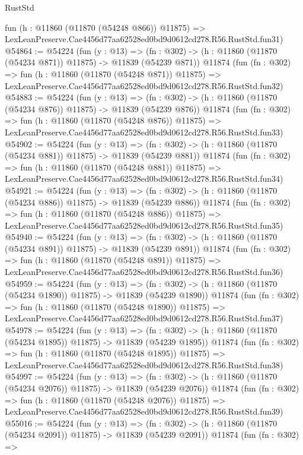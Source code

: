 \begin{lexlean}{RustStd}
\begin{coremodule}
    fun (h : @11860 (@11870 (@54248 @866)) @11875) =>
    LexLeanPreserve.Cae4456d77aa62528ed0bd9d0612cd278.R56.RustStd.fun31)
@54864 := @54224
    (fun (y : @13) =>
    (fn : @302) -> (h : @11860 (@11870 (@54234 @871)) @11875) -> @11839 (@54239 @871))
    @11874
    (fun (fn : @302) =>
    fun (h : @11860 (@11870 (@54248 @871)) @11875) =>
    LexLeanPreserve.Cae4456d77aa62528ed0bd9d0612cd278.R56.RustStd.fun32)
@54883 := @54224
    (fun (y : @13) =>
    (fn : @302) -> (h : @11860 (@11870 (@54234 @876)) @11875) -> @11839 (@54239 @876))
    @11874
    (fun (fn : @302) =>
    fun (h : @11860 (@11870 (@54248 @876)) @11875) =>
    LexLeanPreserve.Cae4456d77aa62528ed0bd9d0612cd278.R56.RustStd.fun33)
@54902 := @54224
    (fun (y : @13) =>
    (fn : @302) -> (h : @11860 (@11870 (@54234 @881)) @11875) -> @11839 (@54239 @881))
    @11874
    (fun (fn : @302) =>
    fun (h : @11860 (@11870 (@54248 @881)) @11875) =>
    LexLeanPreserve.Cae4456d77aa62528ed0bd9d0612cd278.R56.RustStd.fun34)
@54921 := @54224
    (fun (y : @13) =>
    (fn : @302) -> (h : @11860 (@11870 (@54234 @886)) @11875) -> @11839 (@54239 @886))
    @11874
    (fun (fn : @302) =>
    fun (h : @11860 (@11870 (@54248 @886)) @11875) =>
    LexLeanPreserve.Cae4456d77aa62528ed0bd9d0612cd278.R56.RustStd.fun35)
@54940 := @54224
    (fun (y : @13) =>
    (fn : @302) -> (h : @11860 (@11870 (@54234 @891)) @11875) -> @11839 (@54239 @891))
    @11874
    (fun (fn : @302) =>
    fun (h : @11860 (@11870 (@54248 @891)) @11875) =>
    LexLeanPreserve.Cae4456d77aa62528ed0bd9d0612cd278.R56.RustStd.fun36)
@54959 := @54224
    (fun (y : @13) =>
    (fn : @302) -> (h : @11860 (@11870 (@54234 @1890)) @11875) -> @11839 (@54239 @1890))
    @11874
    (fun (fn : @302) =>
    fun (h : @11860 (@11870 (@54248 @1890)) @11875) =>
    LexLeanPreserve.Cae4456d77aa62528ed0bd9d0612cd278.R56.RustStd.fun37)
@54978 := @54224
    (fun (y : @13) =>
    (fn : @302) -> (h : @11860 (@11870 (@54234 @1895)) @11875) -> @11839 (@54239 @1895))
    @11874
    (fun (fn : @302) =>
    fun (h : @11860 (@11870 (@54248 @1895)) @11875) =>
    LexLeanPreserve.Cae4456d77aa62528ed0bd9d0612cd278.R56.RustStd.fun38)
@54997 := @54224
    (fun (y : @13) =>
    (fn : @302) -> (h : @11860 (@11870 (@54234 @2076)) @11875) -> @11839 (@54239 @2076))
    @11874
    (fun (fn : @302) =>
    fun (h : @11860 (@11870 (@54248 @2076)) @11875) =>
    LexLeanPreserve.Cae4456d77aa62528ed0bd9d0612cd278.R56.RustStd.fun39)
@55016 := @54224
    (fun (y : @13) =>
    (fn : @302) -> (h : @11860 (@11870 (@54234 @2091)) @11875) -> @11839 (@54239 @2091))
    @11874
    (fun (fn : @302) =>

\end{coremodule}
\end{lexlean}
